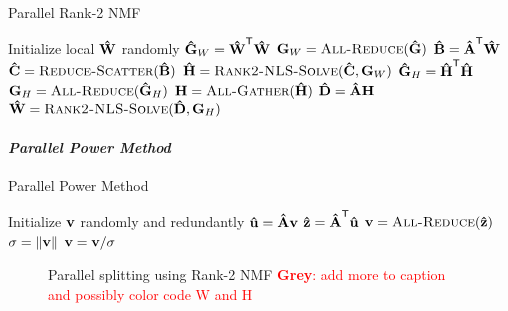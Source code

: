 \documentclass[conference,compsoc]{IEEEtran}
\newcommand{\GB}[1]{\textcolor{red}{\textbf{Grey}: #1}}
\begin{document}
\begin{algorithm}
\caption{Parallel Rank-2 NMF}
\label{alg:parrank2nmf}
\begin{algorithmic}[1]
		\State Initialize local $\M[\hat]{W}$ randomly
			\State {}
			\State $\M[\hat]{G}_W = \M[\hat]{W}^\Tra \M[\hat]{W}$
			\State $\M{G}_W = \textsc{All-Reduce}(\M[\hat]{G})$
			\State $\M[\hat]{B} = \M[\hat]{A}^\Tra \M[\hat]{W}$ %
			\State $\M[\hat]{C} = \textsc{Reduce-Scatter}(\M[\hat]{B})$
			\State $\M[\hat]{H} = \textsc{Rank2-NLS-Solve}(\M[\hat]{C},\M{G}_W)$
			\State {}
			\State $\M[\hat]{G}_H = \M[\hat]{H}^\Tra \M[\hat]{H}$
			\State $\M{G}_H = \textsc{All-Reduce}(\M[\hat]{G}_H)$
			\State $\M{H} = \textsc{All-Gather}(\M[\hat]{H})$
			\State $\M[\hat]{D} = \M[\hat]{A} \M{H}$ %
			\State $\M[\hat]{W} = \textsc{Rank2-NLS-Solve}(\M[\hat]{D},\M{G}_H)$
		\EndWhile
	\EndFunction
\end{algorithmic}
\end{algorithm}

\paragraph{\emph{Parallel Power Method}}

\begin{algorithm}
\caption{Parallel Power Method}
\label{alg:parpowmeth}
\begin{algorithmic}[1]
		\State Initialize $\V{v}$ randomly and redundantly
			\State $\V[\hat]{u} = \M[\hat]{A} \V{v}$
			\State $\V[\hat]{z} = \M[\hat]{A}^\Tra \V[\hat]{u}$
			\State $\V{v} = \textsc{All-Reduce}(\V[\hat]{z})$
			\State $\sigma = \|\V{v}\|$
			\State $\V{v} = \V{v}/\sigma$
		\EndWhile
	\EndFunction
\end{algorithmic}
\end{algorithm}


\begin{figure}

\caption{Parallel splitting using Rank-2 NMF \GB{add more to caption and possibly color code W and H}}
\label{fig:split}
\end{figure}
\end{document}
